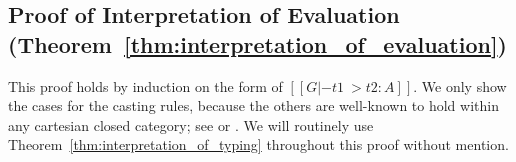 \begin{comment}

  


\end{comment}

\subsection{Proof of Interpretation of Evaluation (Theorem~\ref{thm:interpretation_of_evaluation})}
\label{subsec:proof_of_interpretation_of_evaluation}
This proof holds by induction on the form of $[[G |- t1 ~> t2 : A]]$.
We only show the cases for the casting rules, because the others are
well-known to hold within any cartesian closed category; see
\cite{Lambek:1980} or \cite{Crole:1994}.  We will routinely use
Theorem~\ref{thm:interpretation_of_typing} throughout this proof
without mention.


